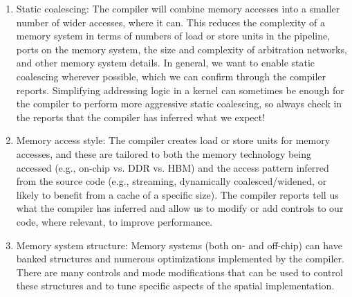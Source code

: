 \begin{enumerate}
	\item Static coalescing: The compiler will combine memory accesses into a smaller number of wider accesses, where it can. This reduces the complexity of a memory system in terms of numbers of load or store units in the pipeline, ports on the memory system, the size and complexity of arbitration networks, and other memory system details. In general, we want to enable static coalescing wherever possible, which we can confirm through the compiler reports. Simplifying addressing logic in a kernel can sometimes be enough for the compiler to perform more aggressive static coalescing, so always check in the reports that the compiler has inferred what we expect!
	\item Memory access style: The compiler creates load or store units for memory accesses, and these are tailored to both the memory technology being accessed (e.g., on-chip vs. DDR vs. HBM) and the access pattern inferred from the source code (e.g., streaming, dynamically coalesced/widened, or likely to benefit from a cache of a specific size). The compiler reports tell us what the compiler has 	inferred and allow us to modify or add controls to our code, where relevant, to improve performance.
	\item Memory system structure: Memory systems (both on- and off-chip) can have banked structures and numerous optimizations implemented by the compiler. There are many controls and mode modifications that can be used to control these structures and to tune specific aspects of the spatial 	implementation.
\end{enumerate}
















